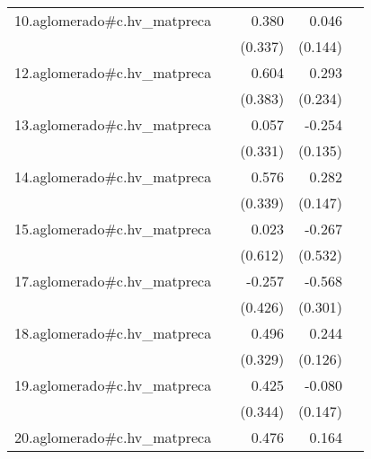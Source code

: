 {\begin{longtable}{l*{4}{D{.}{.}{-1}}}
\addlinespace
10.aglomerado#c.hv\_matpreca&                     &       0.380         &       0.046         &                     \\
            &                     &     (0.337)         &     (0.144)         &                     \\
\addlinespace
12.aglomerado#c.hv\_matpreca&                     &       0.604         &       0.293         &                     \\
            &                     &     (0.383)         &     (0.234)         &                     \\
\addlinespace
13.aglomerado#c.hv\_matpreca&                     &       0.057         &      -0.254         &                     \\
            &                     &     (0.331)         &     (0.135)         &                     \\
\addlinespace
14.aglomerado#c.hv\_matpreca&                     &       0.576         &       0.282         &                     \\
            &                     &     (0.339)         &     (0.147)         &                     \\
\addlinespace
15.aglomerado#c.hv\_matpreca&                     &       0.023         &      -0.267         &                     \\
            &                     &     (0.612)         &     (0.532)         &                     \\
\addlinespace
17.aglomerado#c.hv\_matpreca&                     &      -0.257         &      -0.568         &                     \\
            &                     &     (0.426)         &     (0.301)         &                     \\
\addlinespace
18.aglomerado#c.hv\_matpreca&                     &       0.496         &       0.244         &                     \\
            &                     &     (0.329)         &     (0.126)         &                     \\
\addlinespace
19.aglomerado#c.hv\_matpreca&                     &       0.425         &      -0.080         &                     \\
            &                     &     (0.344)         &     (0.147)         &                     \\
\addlinespace
20.aglomerado#c.hv\_matpreca&                     &       0.476         &       0.164         &                     \\

\end{longtable}}

